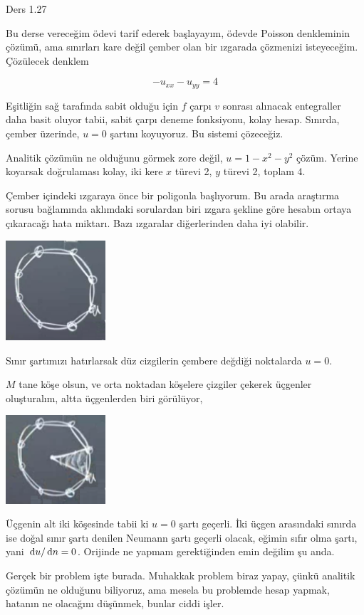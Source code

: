 \documentclass[12pt,fleqn]{article}\usepackage{../../common}
\begin{document}
Ders 1.27

Bu derse vereceğim ödevi tarif ederek başlayayım, ödevde Poisson denkleminin
çözümü, ama sınırları kare değil çember olan bir ızgarada çözmenizi
isteyeceğim. Çözülecek denklem

$$
-u_{xx} - u_{yy} = 4
$$

Eşitliğin sağ tarafında sabit olduğu için $f$ çarpı $v$ sonrası alınacak
entegraller daha basit oluyor tabii, sabit çarpı deneme fonksiyonu, kolay hesap.
Sınırda, çember üzerinde, $u = 0$ şartını koyuyoruz. Bu sistemi çözeceğiz.

Analitik çözümün ne olduğunu görmek zore değil, $u = 1 - x^2 - y^2$ çözüm.
Yerine koyarsak doğrulaması kolay, iki kere $x$ türevi 2, $y$ türevi 2, toplam
4.

Çember içindeki ızgaraya önce bir poligonla başlıyorum. Bu arada araştırma
sorusu bağlamında aklımdaki sorulardan biri ızgara şekline göre hesabın ortaya
çıkaracağı hata miktarı. Bazı ızgaralar diğerlerinden daha iyi olabilir.

\includegraphics[width=10em]{compscieng_1_27_01.png}

Sınır şartımızı hatırlarsak düz cizgilerin çembere değdiği noktalarda $u = 0$.

$M$ tane köşe olsun, ve orta noktadan köşelere çizgiler çekerek üçgenler
oluşturalım, altta üçgenlerden biri görülüyor,

\includegraphics[width=10em]{compscieng_1_27_02.png}

Üçgenin alt iki köşesinde tabii ki $u = 0$ şartı geçerli. İki üçgen arasındaki
sınırda ise doğal sınır şartı denilen Neumann şartı geçerli olacak, eğimin
sıfır olma şartı, yani $\,\mathrm{d} u / \,\mathrm{d} n = 0$. Orijinde ne yapmam gerektiğinden
emin değilim şu anda. 

Gerçek bir problem işte burada. Muhakkak problem biraz yapay, çünkü analitik
çözümün ne olduğunu biliyoruz, ama mesela bu problemde hesap yapmak, hatanın
ne olacağını düşünmek, bunlar ciddi işler. 
\end{document}
